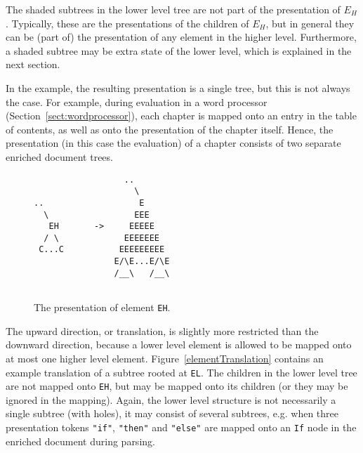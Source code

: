 The shaded subtrees in the lower level tree are not part of the presentation of $E_H$. Typically, these are the presentations of the children of $E_H$, but in general they can be (part of) the presentation of any element in the higher level. Furthermore, a shaded subtree may be extra state of the lower level, which is explained in the next section.


In the example, the resulting presentation is a single tree, but this is not always the case. For example, during evaluation in a word processor (Section~\ref{sect:wordprocessor}), each chapter is mapped onto an entry in the table of contents, as well as onto the presentation of the chapter itself. Hence, the presentation (in this case the evaluation) of a chapter consists of two separate enriched document trees.

\begin{figure}
\begin{center}
\begin{center}
\begin{verbatim}
                  ..
                    \
..                   E
  \                 EEE
   EH       ->     EEEEE
  / \             EEEEEEE 
 C...C           EEEEEEEEE
                E/\E...E/\E
                /__\   /__\
                    
\end{verbatim}
\end{center}
\caption{The presentation of element {\tt EH}.}\label{elementPresentation} 
\end{center}
\end{figure}



The upward direction, or translation, is slightly more restricted than the downward direction, because a lower level element is allowed to be mapped onto at most one higher level element. Figure~\ref{elementTranslation} contains an example translation of a subtree rooted at \verb|EL|. The children in the lower level tree are not mapped onto \verb|EH|, but may be mapped onto its children (or they may be ignored in the mapping).  Again, the lower level structure is not necessarily a single subtree (with holes), it may consist of several subtrees, e.g. when three presentation tokens \verb|"if"|, \verb|"then"| and \verb|"else"| are mapped onto an \verb|If| node in the enriched document during parsing.

